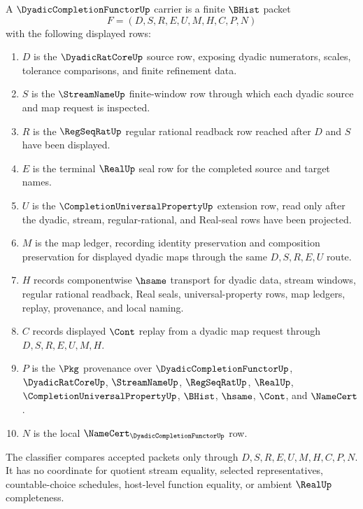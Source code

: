 \begin{definition}
\label{def:dyadic-completion-functor-carrier}
A $\DyadicCompletionFunctorUp$ carrier is a finite $\BHist$ packet
$$
F=(D,S,R,E,U,M,H,C,P,N)
$$
with the following displayed rows:
\begin{enumerate}
\item $D$ is the $\DyadicRatCoreUp$ source row, exposing dyadic numerators, scales, tolerance comparisons, and finite refinement data.
\item $S$ is the $\StreamNameUp$ finite-window row through which each dyadic source and map request is inspected.
\item $R$ is the $\RegSeqRatUp$ regular rational readback row reached after $D$ and $S$ have been displayed.
\item $E$ is the terminal $\RealUp$ seal row for the completed source and target names.
\item $U$ is the $\CompletionUniversalPropertyUp$ extension row, read only after the dyadic, stream, regular-rational, and Real-seal rows have been projected.
\item $M$ is the map ledger, recording identity preservation and composition preservation for displayed dyadic maps through the same $D,S,R,E,U$ route.
\item $H$ records componentwise $\hsame$ transport for dyadic data, stream windows, regular rational readback, Real seals, universal-property rows, map ledgers, replay, provenance, and local naming.
\item $C$ records displayed $\Cont$ replay from a dyadic map request through $D,S,R,E,U,M,H$.
\item $P$ is the $\Pkg$ provenance over $\DyadicCompletionFunctorUp$, $\DyadicRatCoreUp$, $\StreamNameUp$, $\RegSeqRatUp$, $\RealUp$, $\CompletionUniversalPropertyUp$, $\BHist$, $\hsame$, $\Cont$, and $\NameCert$.
\item $N$ is the local $\NameCert_{\DyadicCompletionFunctorUp}$ row.
\end{enumerate}
The classifier compares accepted packets only through $D,S,R,E,U,M,H,C,P,N$. It has no coordinate for quotient stream equality, selected representatives, countable-choice schedules, host-level function equality, or ambient $\RealUp$ completeness.
\end{definition}


